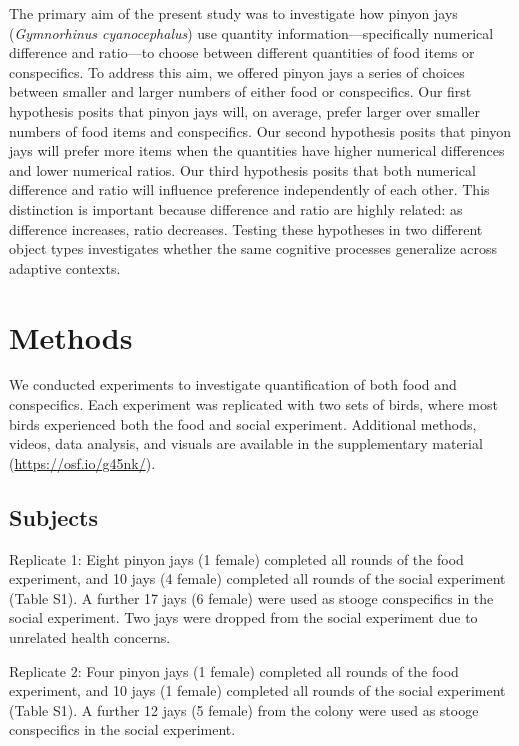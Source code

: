 \documentclass[
  ,doc,floatsintext]{apa6}
\begin{document}
The primary aim of the present study was to investigate how pinyon jays (\emph{Gymnorhinus cyanocephalus}) use quantity information---specifically numerical difference and ratio---to choose between different quantities of food items or conspecifics. To address this aim, we offered pinyon jays a series of choices between smaller and larger numbers of either food or conspecifics. Our first hypothesis posits that pinyon jays will, on average, prefer larger over smaller numbers of food items and conspecifics. Our second hypothesis posits that pinyon jays will prefer more items when the quantities have higher numerical differences and lower numerical ratios. Our third hypothesis posits that both numerical difference and ratio will influence preference independently of each other. This distinction is important because difference and ratio are highly related: as difference increases, ratio decreases. Testing these hypotheses in two different object types investigates whether the same cognitive processes generalize across adaptive contexts.

\hypertarget{methods}{%
\section{Methods}\label{methods}}

We conducted experiments to investigate quantification of both food and conspecifics. Each experiment was replicated with two sets of birds, where most birds experienced both the food and social experiment. Additional methods, videos, data analysis, and visuals are available in the supplementary material (\url{https://osf.io/g45nk/}).

\hypertarget{subjects}{%
\subsection{Subjects}\label{subjects}}

Replicate 1: Eight pinyon jays (1 female) completed all rounds of the food experiment, and 10 jays (4 female) completed all rounds of the social experiment (Table S1). A further 17 jays (6 female) were used as stooge conspecifics in the social experiment. Two jays were dropped from the social experiment due to unrelated health concerns.

Replicate 2: Four pinyon jays (1 female) completed all rounds of the food experiment, and 10 jays (1 female) completed all rounds of the social experiment (Table S1). A further 12 jays (5 female) from the colony were used as stooge conspecifics in the social experiment.
\end{document}
